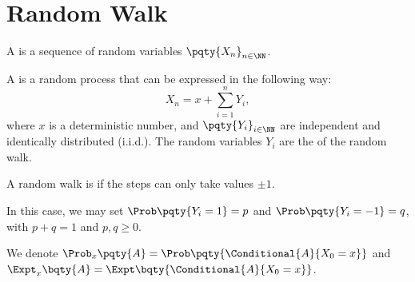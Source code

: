 \section{Random Walk}

\begin{definition}
    \label{def:random-stochastic-process}%
    A  is a sequence of random variables \(\pqty{X_n}_{n \in \NN}\).
\end{definition}

\begin{definition}
    \label{def:random-walk}%
    A  is a random process that can be expressed in the following way:
    \[
        X_n = x + \sum_{i = 1}^{n} Y_i,
    \]
    where \(x\) is a deterministic number, and \(\pqty{Y_i}_{i \in \NN}\) are independent and identically distributed (i.i.d.). The random variables \(Y_i\) are the  of the random walk.
\end{definition}

\begin{definition}
    \label{def:simple-random-walk}%
    A random walk is  if the steps can only take values \(\pm 1\).
\end{definition}

In this case, we may set \(\Prob\pqty{Y_i = 1} = p\) and \(\Prob\pqty{Y_i = -1} = q\), with \(p + q = 1\) and \(p, q \geq 0\).

\begin{notation}
    We denote \(\Prob_x\pqty{A} = \Prob\pqty{\Conditional{A}{X_0 = x}}\) and \(\Expt_x\bqty{A} = \Expt\bqty{\Conditional{A}{X_0 = x}}\).
\end{notation}

